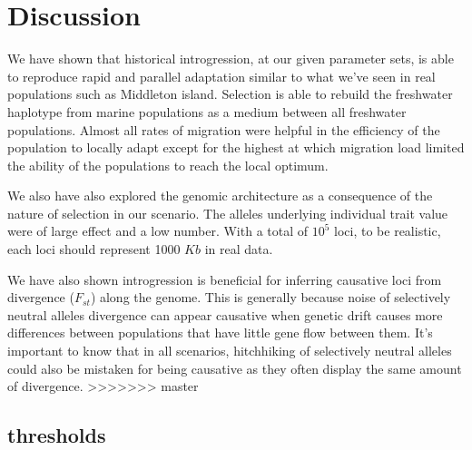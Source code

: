 \documentclass{article}
\begin{document}
\section*{Discussion}

We have shown that historical introgression, at our given parameter sets, is able to reproduce rapid and parallel adaptation similar to what we've seen in real populations such as Middleton island. Selection is able to rebuild the freshwater haplotype from marine populations as a medium between all freshwater populations. Almost all rates of migration were helpful in the efficiency of the population to locally adapt except for the highest at which migration load limited the ability of the populations to reach the local optimum. 

We also have also explored the genomic architecture as a consequence of the nature of selection in our scenario. The alleles underlying individual trait value were of large effect and a low number. With a total of $10^{5}$ loci, to be realistic, each loci should represent 1000 $Kb$ in real data.

We have also shown introgression is beneficial for inferring causative loci from divergence ($F_{st}$) along the genome. 
This is generally because noise of selectively neutral alleles divergence can appear causative when genetic drift causes more 
differences between populations that have little gene flow between them.
It's important to know that in all scenarios, hitchhiking of selectively neutral alleles could also be 
mistaken for being causative as they often display the same amount of divergence.
>>>>>>> master



\subsection*{thresholds}
\end{document}

